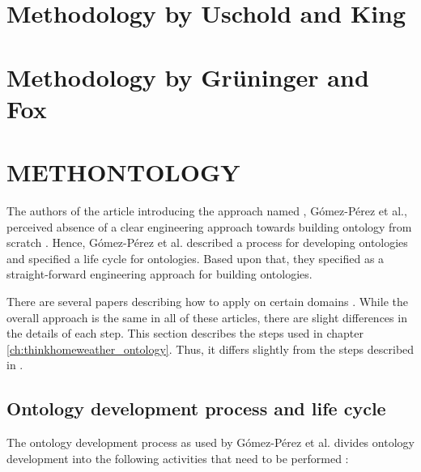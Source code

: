\section{Methodology by Uschold and King}
\label{sec:approach3}

\section{Methodology by Grüninger and Fox}
\label{sec:approach4}

\section{METHONTOLOGY}
\label{sec:approach5}

The authors of the article introducing the approach named \methontology, Gómez-Pérez et al., perceived absence of a clear engineering approach towards building ontology from scratch \cite{Methontology}. Hence, Gómez-Pérez et al. described a process for developing ontologies and specified a life cycle for ontologies. Based upon that, they specified \methontology as a straight-forward engineering approach for building ontologies.

There are several papers describing how to apply \methontology on certain domains \cite{MethontologyLegal} \cite{MethontologyChemical}. While the overall approach is the same in all of these articles, there are slight differences in the details of each step. This section describes the steps used in chapter \ref{ch:thinkhomeweather_ontology}. Thus, it differs slightly from the steps described in \cite{Methontology}.

\subsection{Ontology development process and life cycle}

The ontology development process as used by Gómez-Pérez et al. divides ontology development into the following activities that need to be performed \cite{Methontology}:


